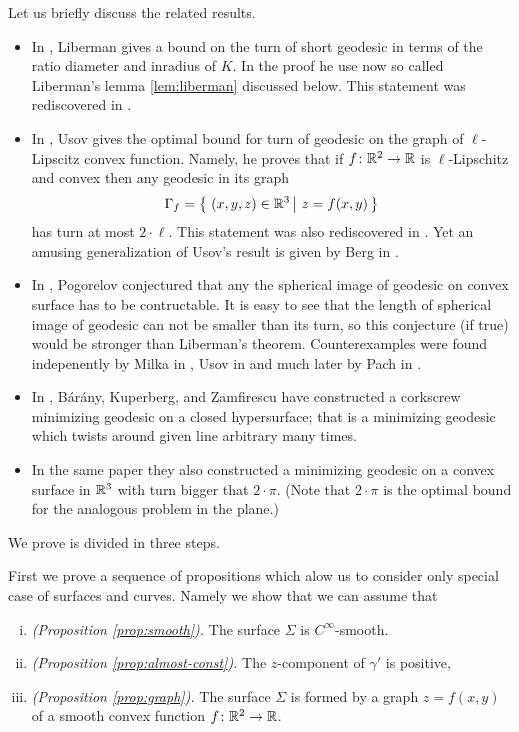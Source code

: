 \documentclass[a4paper,10pt]{amsart}
\begin{document}
Let us briefly discuss the related results.

\begin{itemize}
\item In \cite{liberman}, Liberman gives a bound on the turn of short geodesic in terms of the ratio diameter and inradius of $K$.
In the proof he use now so called Liberman's lemma \ref{lem:liberman} discussed below.
This statement was rediscovered in \cite{BKZ}.
\item In \cite{usov}, Usov gives the optimal bound for turn of geodesic on the graph of $\ell$-Lipscitz convex function. 
Namely, he proves that if $f\colon\mathbb{R}^2\to\mathbb{R}$ is $\ell$-Lipschitz and convex then any 
geodesic in its graph 
\[\Gamma_f=\set{(x,y,z)\in \RR^3}{z=f(x,y)}\] 
has turn at most $2\cdot \ell$.
This statement was also rediscovered in \cite{BKZ}.
Yet an amusing generalization of Usov's result is given by Berg in \cite{berg}.
\item In \cite{pogorelov}, Pogorelov conjectured that any the spherical image of geodesic on convex surface has to be contructable.
It is easy to see that the length of spherical image of geodesic can not be smaller than its turn, so this conjecture (if true) would be stronger than Liberman's theorem.
Counterexamples were found indepenently by Milka in \cite{milka}, 
Usov in \cite{usov-conj-pog} 
and much later by Pach in \cite{pach}.
\item In \cite{BKZ},
B{\'a}r{\'a}ny,
Kuperberg, 
and Zamfirescu 
have constructed a corkscrew minimizing geodesic on a closed hypersurface;
that is a minimizing geodesic which twists around given line arbitrary many times.

\item In the same paper they also constructed a minimizing geodesic on a convex surface in $\mathbb{R}^3$
with turn bigger that $2\cdot\pi$.
(Note that $2\cdot\pi$ is the optimal bound for the analogous problem in the plane.)
\end{itemize}

We prove is divided in three steps.

First we prove a sequence of propositions which alow us to consider only special case of surfaces and curves.
Namely we show that we can assume that
\begin{enumerate}[(i)]
\item\label{smooth}{\it (Proposition \ref{prop:smooth}).} 
The surface $\Sigma$ is $C^\infty$-smooth.
\item{\it (Proposition \ref{prop:almost-const}).}  The $z$-component of $\gamma'$ is positive,
\item\label{graph}{\it (Proposition \ref{prop:graph}).} The surface $\Sigma$ is formed by a graph $z=f(x,y)$ of a smooth convex function $f\colon\mathbb{R}^2\to \mathbb{R}$.
\end{enumerate}
\end{document}
